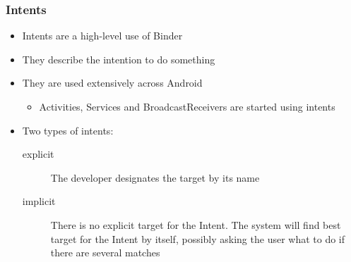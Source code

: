 \begin{frame}
  \frametitle{Intents}
  \begin{itemize}
  \item Intents are a high-level use of Binder
  \item They describe the intention to do something
  \item They are used extensively across Android
    \begin{itemize}
    \item Activities, Services and BroadcastReceivers are started
      using intents
    \end{itemize}
  \item Two types of intents:
    \begin{description}
    \item[explicit] The developer designates the target by its name 
    \item[implicit] There is no explicit target for the Intent. The
      system will find best target for the Intent by itself, possibly
      asking the user what to do if there are several matches
    \end{description}
  \end{itemize}
\end{frame}
